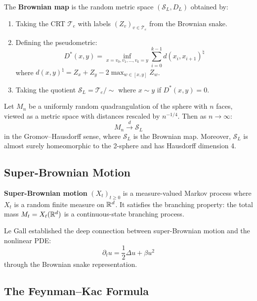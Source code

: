 \begin{definition}
The \textbf{Brownian map} is the random metric space $(\mathcal{S}_L, D_L)$ obtained by:
\begin{enumerate}
    \item Taking the CRT $\mathcal{T}_e$ with labels $(Z_v)_{v \in \mathcal{T}_e}$ from the Brownian snake.
    \item Defining the pseudometric:
    \[
    D^*(x,y) = \inf_{x = v_0, v_1, \ldots, v_k = y} \sum_{i=0}^{k-1} d(x_i, x_{i+1})^{\natural}
    \]
    where $d(x,y)^{\natural} = Z_x + Z_y - 2\max_{w \in [x,y]} Z_w$.
    \item Taking the quotient $\mathcal{S}_L = \mathcal{T}_e / \sim$ where $x \sim y$ if $D^*(x,y) = 0$.
\end{enumerate}
\end{definition}

\begin{theorem}
Let $M_n$ be a uniformly random quadrangulation of the sphere with $n$ faces, viewed as a metric space with distances rescaled by $n^{-1/4}$. Then as $n \to \infty$:
\[
M_n \xrightarrow{d} \mathcal{S}_L
\]
in the Gromov--Hausdorff sense, where $\mathcal{S}_L$ is the Brownian map. Moreover, $\mathcal{S}_L$ is almost surely homeomorphic to the 2-sphere and has Hausdorff dimension 4.
\end{theorem}

\subsection{Super-Brownian Motion}

\begin{definition}
\textbf{Super-Brownian motion} $(X_t)_{t \geq 0}$ is a measure-valued Markov process where $X_t$ is a random finite measure on $\mathbb{R}^d$. It satisfies the branching property: the total mass $M_t = X_t(\mathbb{R}^d)$ is a continuous-state branching process.
\end{definition}

Le Gall established the deep connection between super-Brownian motion and the nonlinear PDE:
\[
\partial_t u = \frac{1}{2}\Delta u + \beta u^2
\]
through the Brownian snake representation.

\subsection{The Feynman--Kac Formula}

